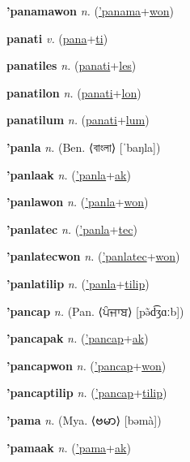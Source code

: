 \textbf{\hypertarget{'panamawon}{'panamawon}} \textit{n.} (\hyperlink{'panama}{'panama}+\allowbreak \hyperlink{won}{won})


\textbf{\hypertarget{panati}{panati}} \textit{v.} (\hyperlink{pana}{pana}+\allowbreak \hyperlink{ti}{ti})


\textbf{\hypertarget{panatiles}{panatiles}} \textit{n.} (\hyperlink{panati}{panati}+\allowbreak \hyperlink{les}{les})


\textbf{\hypertarget{panatilon}{panatilon}} \textit{n.} (\hyperlink{panati}{panati}+\allowbreak \hyperlink{lon}{lon})


\textbf{\hypertarget{panatilum}{panatilum}} \textit{n.} (\hyperlink{panati}{panati}+\allowbreak \hyperlink{lum}{lum})


\textbf{\hypertarget{'panla}{'panla}} \textit{n.} (Ben. ⟨{\bengali{}বাংলা}⟩ [ˈbaŋla])


\textbf{\hypertarget{'panlaak}{'panlaak}} \textit{n.} (\hyperlink{'panla}{'panla}+\allowbreak \hyperlink{ak}{ak})


\textbf{\hypertarget{'panlawon}{'panlawon}} \textit{n.} (\hyperlink{'panla}{'panla}+\allowbreak \hyperlink{won}{won})


\textbf{\hypertarget{'panlatec}{'panlatec}} \textit{n.} (\hyperlink{'panla}{'panla}+\allowbreak \hyperlink{tec}{tec})


\textbf{\hypertarget{'panlatecwon}{'panlatecwon}} \textit{n.} (\hyperlink{'panlatec}{'panlatec}+\allowbreak \hyperlink{won}{won})


\textbf{\hypertarget{'panlatilip}{'panlatilip}} \textit{n.} (\hyperlink{'panla}{'panla}+\allowbreak \hyperlink{tilip}{tilip})


\textbf{\hypertarget{'pancap}{'pancap}} \textit{n.} (Pan. ⟨{\gurmukhi{}ਪੰਜਾਬ}⟩ [pə̃d͡ʒɑːb])


\textbf{\hypertarget{'pancapak}{'pancapak}} \textit{n.} (\hyperlink{'pancap}{'pancap}+\allowbreak \hyperlink{ak}{ak})


\textbf{\hypertarget{'pancapwon}{'pancapwon}} \textit{n.} (\hyperlink{'pancap}{'pancap}+\allowbreak \hyperlink{won}{won})


\textbf{\hypertarget{'pancaptilip}{'pancaptilip}} \textit{n.} (\hyperlink{'pancap}{'pancap}+\allowbreak \hyperlink{tilip}{tilip})


\textbf{\hypertarget{'pama}{'pama}} \textit{n.} (Mya. ⟨{\myanmar{}ဗမာ}⟩ [bəmà])


\textbf{\hypertarget{'pamaak}{'pamaak}} \textit{n.} (\hyperlink{'pama}{'pama}+\allowbreak \hyperlink{ak}{ak})


